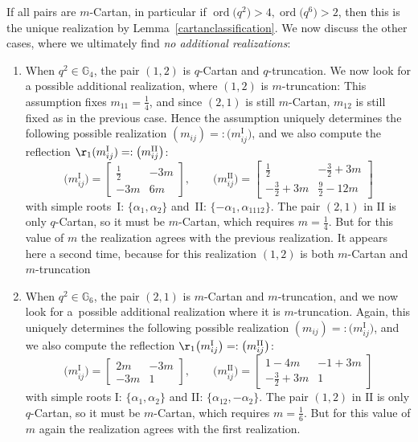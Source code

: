 \documentclass[pdftex]{sigma}%
\numberwithin{equation}{section}
\begin{document}
If all pairs are $m$-Cartan, in particular if
$\operatorname{ord}\big(q^2\big)>4,\operatorname{ord}\big(q^6\big)>2$, then this is the unique realization by Lemma~\ref{cartanclassification}. We now discuss the other cases, where we ultimately find {\it no additional realizations}:
\begin{enumerate}\itemsep=0pt
	\item
When $q^2 \in \mathbb{G}_4$, the pair $(1,2)$ is $q$-Cartan and $q$-truncation. We now look for a possible additional realization, where $(1,2)$ is $m$-truncation: This assumption fixes $m_{11}=\frac{1}{4}$, and since $(2,1)$ is still $m$-Cartan, $m_{12}$ is still fixed as in the previous case. Hence the assumption uniquely determines the following possible realization $(m_{ij})=:\big(m_{ij}^\mathrm{I}\big)$, and we also compute the reflection $\r_1(m_{ij}^\mathrm{I})=:\big(m_{ij}^\mathrm{II}\big)$:
\[\big(m_{ij}^{\mathrm{I}}\big)= \begin{bmatrix}
 \frac{1}{2} & -3m\\
 -3m & 6m
\end{bmatrix}, \qquad \big(m_{ij}^{\mathrm{II}}\big)= \begin{bmatrix}
 \frac{1}{2} & -\frac{3}{2} + 3m\\
 -\frac{3}{2} + 3m & \frac{9}{2} -12m
\end{bmatrix} \]
with simple roots~I: $\lbrace\alpha_1, \alpha_2\rbrace$ and~II: $\lbrace -\alpha_{1}, \alpha_{1112}\rbrace$.
The pair $(2,1)$ in $\mathrm{II}$ is only $q$-Cartan, so it must be $m$-Cartan, which requires $m= \frac{1}{4}$. But for this value of $m$ the realization agrees with the previous realization. It appears here a second time, because for this realization $(1,2)$ is both $m$-Cartan and $m$-truncation

\item When $q^2\in \mathbb{G}_6$, the pair $(2,1)$ is $m$-Cartan and $m$-truncation, and we now look for a~possible additional realization where it is $m$-truncation. Again, this uniquely determines the following possible realization $(m_{ij})=:\big(m_{ij}^\mathrm{I}\big)$, and we also compute the reflection $\r_1\big(m_{ij}^\mathrm{I}\big)=:\big(m_{ij}^\mathrm{II}\big)$:
\[\big(m_{ij}^{\mathrm{I}}\big)= \begin{bmatrix}
 2m & -3m\\
 -3m & 1
\end{bmatrix}, \qquad \big(m_{ij}^{\mathrm{II}}\big)= \begin{bmatrix}
 1 - 4m & -1 + 3m\\
 -\frac{3}{2} + 3m & 1
\end{bmatrix} \]
with simple roots I: $\lbrace\alpha_1, \alpha_2\rbrace$ and II: $\lbrace \alpha_{12}, -\alpha_{2}\rbrace$. The pair $(1,2)$ in $\mathrm{II}$ is only $q$-Cartan, so it must be $m$-Cartan, which requires $m= \frac{1}{6}$. But for this value of $m$ again the realization agrees with the first realization.
\end{enumerate}
\end{document}
